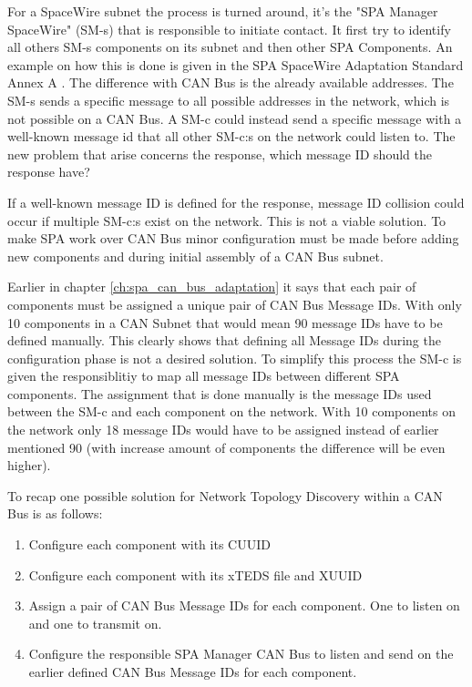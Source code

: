 For a SpaceWire subnet the process is turned around, it's the "SPA Manager
SpaceWire" (SM-s) that is responsible to initiate contact. It first try to identify
all others SM-s components on its subnet and then other SPA Components. An example
on how this is done is given in the SPA SpaceWire Adaptation Standard Annex A
\cite{standard:spa_spacewire_adaptation}. The difference with CAN Bus is
the already available addresses. The SM-s sends a specific message to all
possible addresses in the network, which is not possible on a CAN Bus. A SM-c
could instead send a specific message with a well-known message id that all
other SM-c:s on the network could listen to. The new problem that arise concerns
the response, which message ID should the response have?

If a well-known message ID is defined for the response, message ID collision
could occur if multiple SM-c:s exist on the network. This is not a viable solution.
To make SPA work over CAN Bus minor configuration must be made before adding
new components and during initial assembly of a CAN Bus subnet.

Earlier in chapter \ref{ch:spa_can_bus_adaptation} it says that each pair of
components must be assigned a unique pair of CAN Bus Message IDs. With only
10 components in a CAN Subnet that would mean 90 message IDs have to be defined
manually. This clearly shows that defining all Message IDs during the configuration
phase is not a desired solution. To simplify this process the SM-c is given the
responsiblitiy to map all message IDs between different SPA components. The
assignment that is done manually is the message IDs used between the SM-c and
each component on the network. With 10 components on the network only 18 message
IDs would have to be assigned instead of earlier mentioned 90 (with increase
amount of components the difference will be even higher).

To recap one possible solution for Network Topology Discovery within a CAN Bus
is as follows:
\begin{enumerate}
    \item Configure each component with its CUUID
    \item Configure each component with its xTEDS file and XUUID
    \item Assign a pair of CAN Bus Message IDs for each component. One to listen
        on and one to transmit on.
    \item Configure the responsible SPA Manager CAN Bus to listen and send on the
        earlier defined CAN Bus Message IDs for each component.
\end{enumerate}


